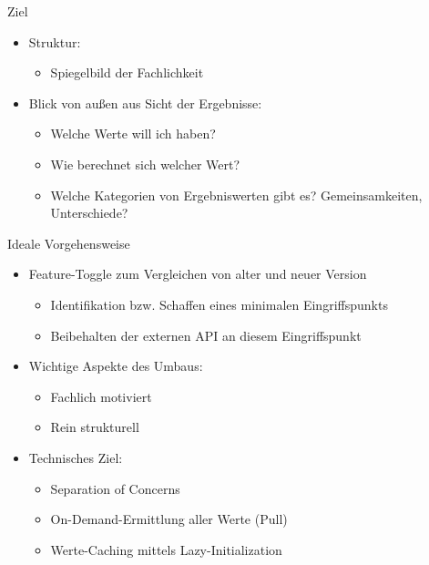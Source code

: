 \begin{frame}[fragile]{Ziel}
\begin{itemize}
\item Struktur:
\begin{itemize}
\item Spiegelbild der Fachlichkeit
\end{itemize}
\end{itemize}

\begin{itemize}
\item Blick von außen aus Sicht der Ergebnisse:
\begin{itemize}
\item Welche Werte will ich haben?
\item Wie berechnet sich welcher Wert?
\item Welche Kategorien von Ergebniswerten gibt es? Gemeinsamkeiten, Unterschiede?
\end{itemize}
\end{itemize}
\end{frame}


\begin{frame}[fragile]{Ideale Vorgehensweise}
\begin{itemize}
\item Feature-Toggle zum Vergleichen von alter und neuer Version
\begin{itemize}
\item Identifikation bzw. Schaffen eines minimalen Eingriffspunkts
\item Beibehalten der externen API an diesem Eingriffspunkt
\end{itemize}
\end{itemize}

\begin{itemize}
\item Wichtige Aspekte des Umbaus:
\begin{itemize}
\item Fachlich motiviert
\item Rein strukturell
\end{itemize}
\end{itemize}

\begin{itemize}
\item Technisches Ziel:
\begin{itemize}
\item Separation of Concerns
\item On-Demand-Ermittlung aller Werte (\glqq Pull\grqq{})
\item Werte-Caching mittels Lazy-Initialization
\end{itemize}

\end{itemize}
\end{frame}



